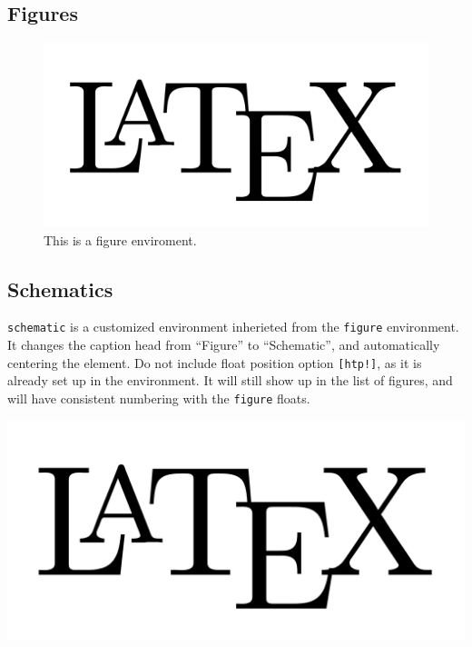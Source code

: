 \documentclass[draft]{emory}
\begin{document}
\subsection{Figures}

\begin{figure}[htp!]
  \centering
  \includegraphics[width=\textwidth]{LaTeXLogo.png}
  \caption{This is a figure enviroment.\label{fig}}
\end{figure}

\subsection{Schematics}

\Verb|schematic| is a customized environment inherieted from the \Verb|figure|
environment. It changes the caption head from ``Figure'' to ``Schematic'', and 
automatically centering the element. Do not include float position option
\Verb|[htp!]|, as it is already set up in the environment. It will still show
up in the list of figures, and will have consistent numbering with the \Verb|figure|
floats.

\begin{schematic}
  \includegraphics[width=\textwidth]{LaTeXLogo.png}
  \caption{This is actually not a schematic.\label{schematic}}
\end{schematic}
\end{document}
